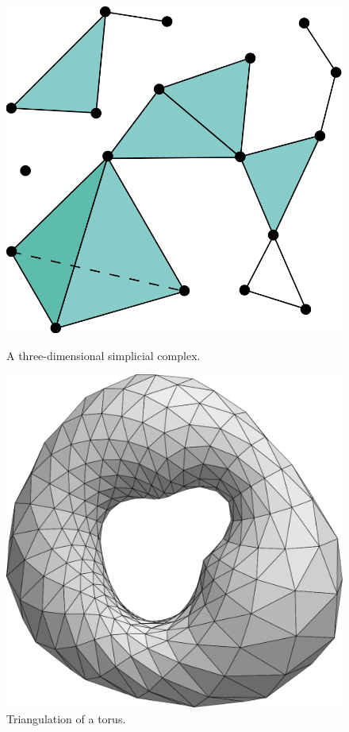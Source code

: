 \begin{figure}
\begin{minipage}{0.45\linewidth}
	\centering
	\includegraphics[width=\linewidth]{img/intro/simplicalComplex.png}
	\caption{A three-dimensional simplicial complex.}
	\label{fig-simplicialComplex}
\end{minipage}\hfill
\begin{minipage}{0.45\linewidth}
	\centering
	\includegraphics[width=\linewidth]{img/intro/triangulation.png}
	\caption{Triangulation of a torus.}
	\label{fig-triangulation}
\end{minipage}
\end{figure}

